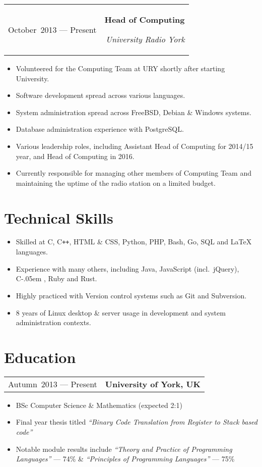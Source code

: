 \documentclass[11pt,a4paper]{article}
\newcommand{\cpp}{C{}\texttt{++}}
\newcommand{\cs}{\settoheight{\dimen0}{C}C\kern-.05em \resizebox{!}{\dimen0}{\raisebox{\depth}{\textbf{\#}}}}
\newenvironment{myitemize}
{\begin{itemize}[leftmargin=.75in,rightmargin=.75in]
  \itemsep1pt \parskip0pt \parsep0pt}
{\end{itemize}}
\begin{document}
\noindent\begin{tabularx}{\textwidth}{@{}L R@{}}
  October~2013 --- Present &
  \textbf{Head of Computing} \par
  \textit{University Radio York}
\end{tabularx}
\begin{myitemize}
  \item Volunteered for the Computing Team at URY shortly after starting
    University.
  \item Software development spread across various languages.
  \item System administration spread across FreeBSD, Debian \& Windows systems.
  \item Database administration experience with PostgreSQL\@.
  \item Various leadership roles, including Assistant Head of Computing for
    2014/15 year, and Head of Computing in 2016.
  \item Currently responsible for managing other members of Computing Team and
    maintaining the uptime of the radio station on a limited budget.
\end{myitemize}

\section{Technical Skills}
\begin{myitemize}
  \item Skilled at C, \cpp, HTML \& CSS, Python, PHP, Bash, Go, SQL and \LaTeX{}
    languages.
  \item Experience with many others, including Java, JavaScript (incl.\ jQuery),
    \cs{}, Ruby and Rust.
  \item Highly practiced with Version control systems such as Git and
    Subversion.
  \item 8 years of Linux desktop \& server usage in development and system
    administration contexts.
\end{myitemize}

\section{Education}
\noindent\begin{tabularx}{\textwidth}{@{}L R@{}}
  Autumn~2013 --- Present &
  \textbf{University of York, UK}
\end{tabularx}
\begin{myitemize}
  \item BSc Computer Science \& Mathematics (expected 2:1)
  \item Final year thesis titled \textit{``Binary Code Translation from
    Register to Stack based code''}
  \item Notable module results include \textit{``Theory and Practice of
    Programming Languages''} --- 74\% \& \textit{``Principles of Programming
    Languages''} --- 75\%
\end{myitemize}
\end{document}
